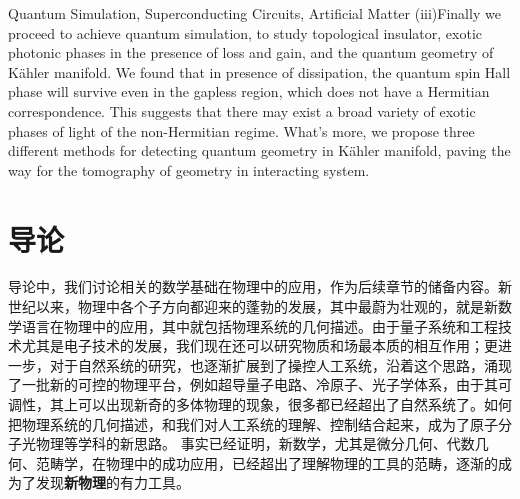 \documentclass[supercite]{HustGraduPaper}
\begin{document}
\begin{enabstract}{Quantum Simulation, Superconducting Circuits, Artificial Matter}
	 (iii)Finally we proceed to achieve quantum simulation, to study topological insulator, exotic photonic phases in the presence of loss and gain, and the quantum geometry of Kähler manifold.  We found that in presence of dissipation, the quantum spin Hall phase will survive even in the gapless region, which does not have a Hermitian correspondence. This suggests that there may exist a broad variety of exotic phases of light of the non-Hermitian regime. What's more, we propose three different methods for detecting quantum geometry in Kähler manifold, paving the way for the tomography of geometry in interacting system. 

	\end{enabstract}
	
	\tableofcontents
	\clearpage%
	
	
	\section{导论}
	导论中，我们讨论相关的数学基础在物理中的应用，作为后续章节的储备内容。新世纪以来，物理中各个子方向都迎来的蓬勃的发展，其中最蔚为壮观的，就是新数学语言在物理中的应用，其中就包括物理系统的几何描述。由于量子系统和工程技术尤其是电子技术的发展，我们现在还可以研究物质和场最本质的相互作用；更进一步，对于自然系统的研究，也逐渐扩展到了操控人工系统，沿着这个思路，涌现了一批新的可控的物理平台，例如超导量子电路、冷原子\cite{Goldman2010,Grusdt2014,Goldman2014,aidelsburger2011experimental,Zhai2015,Wang2010}、光子学体系\cite{khanikaev2013photonic,ozawa2018topological,schomerus2013parity,yang2018ideal,cheng2016robust}，由于其可调性，其上可以出现新奇的多体物理的现象，很多都已经超出了自然系统了。如何把物理系统的几何描述，和我们对人工系统的理解、控制结合起来，成为了原子分子光物理等学科的新思路。 事实已经证明，新数学，尤其是微分几何、代数几何、范畴学，在物理中的成功应用，已经超出了理解物理的工具的范畴，逐渐的成为了发现\textbf{新物理}的有力工具\cite{baianu2009algebraic,chen2010local,wen1990topological,wen1989vacuum}。
	
\end{document}
